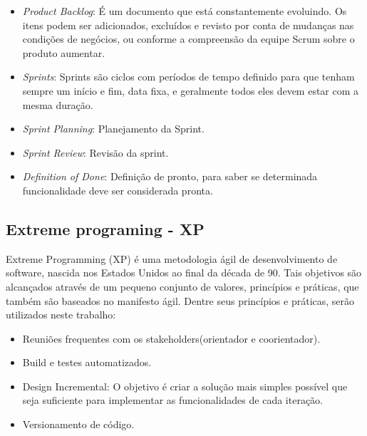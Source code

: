   \begin{itemize}                                                               
  \item \textit{Product Backlog}: É um documento que está constantemente evoluindo.
  Os itens podem ser adicionados, excluídos e revisto por conta de mudanças nas 
  condições de negócios, ou conforme a compreensão da equipe Scrum sobre o produto
   aumentar.                                                                    
  \cite{mindmasterScrum}                                                        
  \item \textit{Sprints}: Sprints são ciclos com períodos de tempo definido  para
   que tenham sempre um início e fim, data fixa, e geralmente todos eles devem 
   estar com a mesma duração.                                                   
  \cite{mindmasterScrum}                                                        
  \item \textit{Sprint Planning}: Planejamento da Sprint.                       
  \item \textit{Sprint Review}: Revisão da sprint.                              
  \item \textit{Definition of Done}: Definição de pronto, para saber se determinada
  funcionalidade deve ser considerada pronta.                                   
  \cite{mindmasterScrum}                                                        
  \end{itemize}

\subsection{Extreme programing - XP}
\label{Sec:xp}
Extreme Programming (XP) é uma metodologia ágil de desenvolvimento de software, 
nascida nos Estados Unidos ao final da década de 90. Tais objetivos são 
alcançados através de um pequeno conjunto de valores, princípios
 e práticas, que também são baseados no manifesto ágil. Dentre seus princípios 
e práticas, serão utilizados neste trabalho: 

  \begin{itemize}
  \item Reuniões frequentes com os stakeholders(orientador e coorientador).     
  \item Build e testes automatizados.
  \cite{praticaXp}
  \item Design Incremental: O objetivo é criar a solução mais simples possível 
  que seja suficiente para implementar as funcionalidades de cada iteração.
  \cite{praticaXp}                                                        
  \item Versionamento de código.
  \cite{praticaXp}                                                        
  \end{itemize}                                                                 
  
